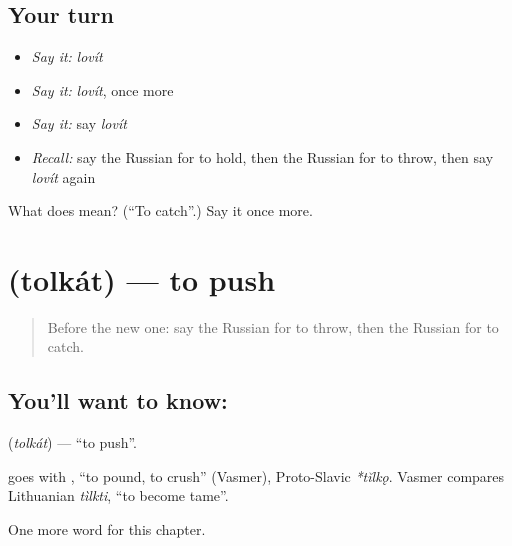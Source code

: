 \subsection*{Your turn}
\begin{itemize}
\raggedright
  \item \emph{Say it:} \emph{lovít}
  \item \emph{Say it:} \emph{lovít}, once more
  \item \emph{Say it:} say \emph{lovít}
  \item \emph{Recall:} say the Russian for to hold, then the Russian for to throw, then say \emph{lovít} again
\end{itemize}

\begin{tcolorbox}[breakable,colback=teal!4,colframe=teal!35!black,title={Before you move on}]
What does  mean? (\textquotedblleft{}To catch\textquotedblright{}.) Say it once more.
\end{tcolorbox}
\section[\texorpdfstring{\ru{толкать} (tolkát)}{толкать (tolkát)}]{ (tolkát) — to push}

\label{lesson:RU-C142-tolkat}



\begin{quote}
Before the new one: say the Russian for to throw, then the Russian for to catch.
\end{quote}

\subsection*{You'll want to know: }
\textbf{} (\emph{tolkát}) — \textquotedblleft{}to push\textquotedblright{}.

\begin{cousinweb}
\textbf{} goes with \emph{}, \textquotedblleft{}to pound, to crush\textquotedblright{} (Vasmer), Proto-Slavic \emph{*tĭlkǫ}. Vasmer compares Lithuanian \emph{tìlkti}, \textquotedblleft{}to become tame\textquotedblright{}.
\end{cousinweb}

\begin{grammarlens}[title={What you've built}]
One more word for this chapter.
\end{grammarlens}

